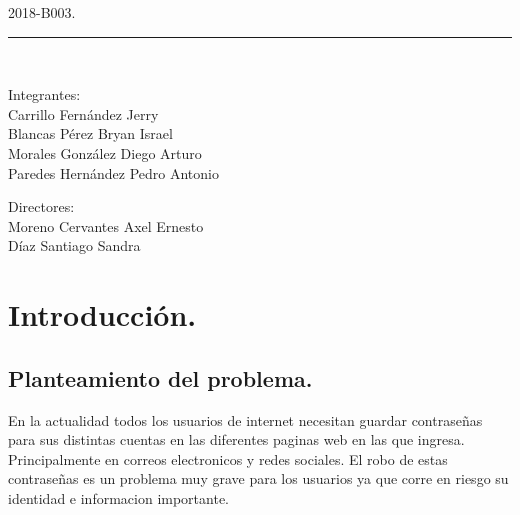 \documentclass[12pt, a4paper, titlepage]{article}
\begin{document}
\begin{titlepage}
\begin{center}
			\begin{large}
				2018-B003.\\
			\end{large}
			
			\vspace*{0.2in}
			
			\rule{80mm}{.1mm}\\
			\vspace*{0.1in}
			
			\begin{large}
				\begin{center}
					Integrantes:\\
					Carrillo Fernández Jerry\\
					Blancas Pérez Bryan Israel\\
					Morales González Diego Arturo\\
					Paredes Hernández Pedro Antonio\\
				\end{center}
			\end{large}
			
			\begin{large}
				Directores:\\
				Moreno Cervantes Axel Ernesto\\
				Díaz Santiago Sandra\\
			\end{large}
			
		\end{center}
	
	\end{titlepage}

	\begin{appendix}
		\href{}{\renewcommand*\contentsname{{\textcolor{azulescom}{Índice.}}}}
		\tableofcontents
		\newpage
		\renewcommand*\listfigurename{{\textcolor{azulescom}{Índice de figuras.}}}
		\listoffigures
		\newpage
		\newpage
		\renewcommand*\listtablename{{\textcolor{azulescom}{Índice de cuadros.}}}
		\listoftables
	\end{appendix}
	\newpage
	

	\section{\textcolor{azulescom}{Introducción.}}
		\subsection{Planteamiento del problema.}
			En la actualidad todos los usuarios de internet necesitan guardar contraseñas para sus distintas cuentas en las diferentes paginas web en las que ingresa. Principalmente en correos electronicos y redes sociales. El robo de estas contraseñas es un problema muy grave para los usuarios ya que corre en riesgo su identidad e informacion importante.
\end{document}
